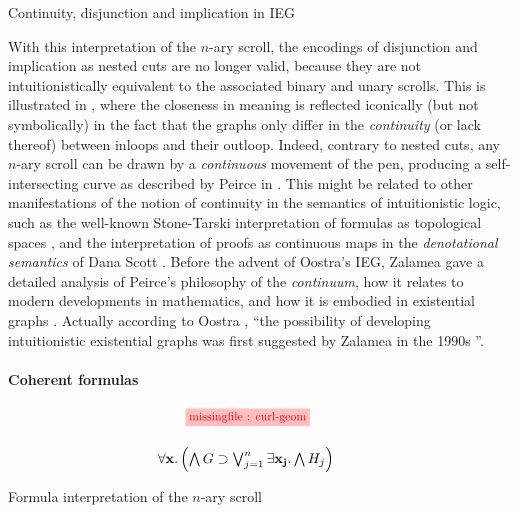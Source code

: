 \begin{marginfigure}
  
  \caption{Continuity, disjunction and implication in IEG}
\end{marginfigure}

With this interpretation of the $n$-ary scroll, the  encodings of
disjunction and implication as nested cuts are no longer valid, because they are
not intuitionistically equivalent to the associated binary and unary scrolls.
This is illustrated in , where the closeness in meaning is
reflected iconically (but not symbolically) in the fact that the graphs only
differ in the \emph{continuity} (or lack thereof) between inloops and their
outloop. Indeed, contrary to nested cuts, any $n$-ary scroll can be drawn by a
\emph{continuous} movement of the pen, producing a self-intersecting curve as
described by Peirce in \cite{peirce_prolegomena_1906}. This might be related to
other manifestations of the notion of continuity in the semantics of
intuitionistic logic, such as the well-known Stone-Tarski interpretation of
formulas as topological spaces \cite{stone_topological_1938}, and the
interpretation of proofs as continuous maps in the \emph{denotational semantics}
of Dana Scott . Before the advent of Oostra's
IEG, Zalamea gave a detailed analysis of Peirce's philosophy of
the \emph{continuum}, how it relates to modern developments in mathematics, and
how it is embodied in existential graphs \cite{zalamea_peirces_2003}. Actually
according to Oostra , ``the
possibility of developing intuitionistic existential graphs was first suggested
by Zalamea in the 1990s \cite{zalamea_ieg_1}\cite{zalamea_ieg_2}''.

\paragraph{Coherent formulas}

\begin{marginfigure}
  $$
  \!\!\!\!
  \!\!\!\!
  \!\!\!\!
  \begin{array}{c}
    \tikzfig{0.85}{0.85}{curl-geom} \vspace{1.5em}\\
    \forall \mathbf{x}. \left(\bigwedge G \limp \bigvee_{j = 1}^{n}\exists \mathbf{x_j}. \bigwedge H_j\right)
  \end{array}
  $$
  \caption{Formula interpretation of the $n$-ary scroll}
\end{marginfigure}

